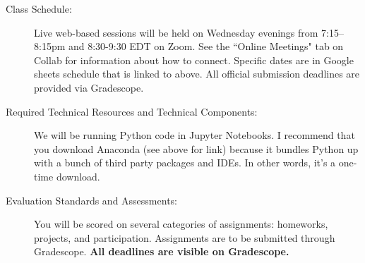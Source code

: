 \documentclass[11pt]{article}
\begin{document}
\begin{description}
\item[Class Schedule:]  

Live web-based sessions will be held on Wednesday evenings from 7:15–8:15pm and 8:30-9:30 EDT on Zoom. See the ``Online Meetings" tab on Collab for information about how to connect. Specific dates are in Google sheets schedule that is linked to above. All official submission deadlines are provided via Gradescope. 

\item[Required Technical Resources and Technical Components:]  

We will be running Python code in Jupyter Notebooks. I recommend that you download Anaconda (see above for link) because it bundles Python up with a bunch of third party packages and IDEs. In other words, it's a one-time download. 

\item[Evaluation Standards and Assessments:] 

You will be scored on several categories of assignments: homeworks, projects, and participation. Assignments are to be submitted through Gradescope. {\bf All deadlines are visible on Gradescope.}


\end{description}
\end{document}
